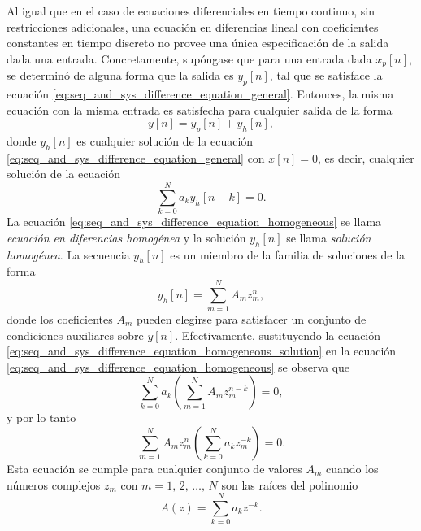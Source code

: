\documentclass[a4paper]{report}
\begin{document}
Al igual que en el caso de ecuaciones diferenciales en tiempo continuo, sin restricciones adicionales, una ecuación en diferencias lineal con coeficientes constantes en tiempo discreto no provee una única especificación de la salida dada una entrada. Concretamente, supóngase que para una entrada dada \(x_p[n]\), se determinó de alguna forma que la salida es \(y_p[n]\), tal que se satisface la ecuación \ref{eq:seq_and_sys_difference_equation_general}. Entonces, la misma ecuación con la misma entrada es satisfecha para cualquier salida de la forma 
\[
 y[n]=y_p[n]+y_h[n],
\]
donde \(y_h[n]\) es cualquier solución de la ecuación \ref{eq:seq_and_sys_difference_equation_general} con \(x[n]=0\), es decir, cualquier solución de la ecuación
\begin{equation}\label{eq:seq_and_sys_difference_equation_homogeneous}
 \sum_{k=0}^Na_ky_h[n-k]=0. 
\end{equation}
La ecuación \ref{eq:seq_and_sys_difference_equation_homogeneous} se llama \emph{ecuación en diferencias homogénea} y la solución \(y_h[n]\) se llama \emph{solución homogénea}. La secuencia \(y_h[n]\) es un miembro de la familia de soluciones de la forma
\begin{equation}\label{eq:seq_and_sys_difference_equation_homogeneous_solution}
 y_h[n]=\sum_{m=1}^NA_mz_m^n, 
\end{equation}
donde los coeficientes \(A_m\) pueden elegirse para satisfacer un conjunto de condiciones auxiliares sobre \(y[n]\). Efectivamente, sustituyendo la ecuación \ref{eq:seq_and_sys_difference_equation_homogeneous_solution} en la ecuación \ref{eq:seq_and_sys_difference_equation_homogeneous} se observa que 
\[
 \sum_{k=0}^Na_k\left(\sum_{m=1}^NA_mz_m^{n-k}\right)=0,
\]
y por lo tanto
\[
 \sum_{m=1}^NA_mz_m^n\left(\sum_{k=0}^Na_kz_m^{-k}\right)=0.
\]
Esta ecuación se cumple para cualquier conjunto de valores \(A_m\) cuando los números complejos \(z_m\) con \(m=1,\,2,\,\dots,\,N\) son las raíces del polinomio
\begin{equation}\label{eq:seq_and_sys_difference_equation_homogeneous_solution_Az}
 A(z)=\sum_{k=0}^Na_kz^{-k}. 
\end{equation}
\end{document}
